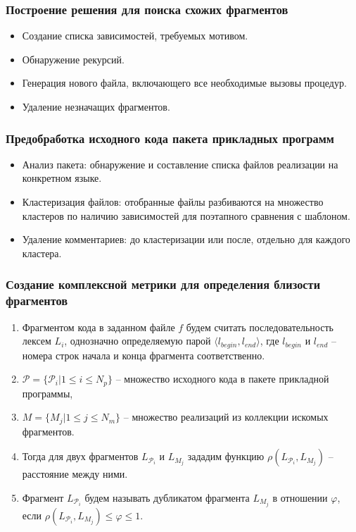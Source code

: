 \documentclass{beamer}
\begin{document}
\begin{frame}
\frametitle{Построение решения для поиска схожих фрагментов}
\begin{itemize}
	\item Создание списка зависимостей, требуемых мотивом.
	\item Обнаружение рекурсий.
	\item Генерация нового файла, включающего все необходимые вызовы процедур.
	\item Удаление незначащих фрагментов.
\end{itemize}
\end{frame}

\begin{frame}
\frametitle{Предобработка исходного кода пакета прикладных программ}
\begin{itemize}
	\item Анализ пакета: обнаружение и составление списка файлов реализации на
	 конкретном языке.
	\item Кластеризация файлов: отобранные файлы разбиваются на множество кластеров
по наличию зависимостей для поэтапного сравнения с шаблоном.
	\item Удаление комментариев: до кластеризации или после,
отдельно для каждого кластера.
\end{itemize}
\end{frame}



\begin{frame}
\frametitle{Создание комплексной метрики для определения близости фрагментов}
\begin{enumerate}
	\item Фрагментом кода в заданном файле $f$ будем считать последовательность лексем $L_i$, однозначно определяемую парой $\langle l_{begin}, l_{end}\rangle$, где $l_{begin}$ и $l_{end}$ -- номера строк начала и конца фрагмента соответственно.
	
	\item $\mathcal{P} = \{\mathcal{P}_i | 1 \leq i \leq N_p \}$ -- множество  исходного кода в пакете прикладной программы, 
	
	\item $ M = \{M_j | 1 \leq j \leq N_m \}$ -- множество реализаций из коллекции искомых фрагментов.	
	
	\item Тогда для двух фрагментов $L_{\mathcal{P}_i}$ и $L_{M_j}$ зададим функцию $\rho (L_{\mathcal{P}_i}, L_{M_j})$ -- расстояние между ними.
	\item Фрагмент $L_{\mathcal{P}_i}$ будем называть дубликатом фрагмента $L_{M_j}$ в отношении $ \varphi$, если $\rho (L_{\mathcal{P}_i}, L_{M_j}) \leq \varphi \leq 1$.
\end{enumerate}
\end{frame}
\end{document}
